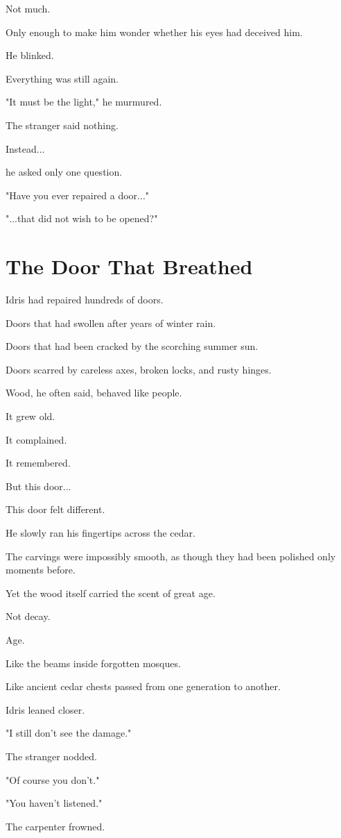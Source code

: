 \documentclass[12pt,openany]{book}
\begin{document}
Not much.

Only enough to make him wonder whether his eyes had deceived him.

He blinked.

Everything was still again.

"It must be the light," he murmured.

The stranger said nothing.

Instead...

he asked only one question.

"Have you ever repaired a door..."

"...that did not wish to be opened?"
\section*{The Door That Breathed}

Idris had repaired hundreds of doors.

Doors that had swollen after years of winter rain.

Doors that had been cracked by the scorching summer sun.

Doors scarred by careless axes, broken locks, and rusty hinges.

Wood, he often said, behaved like people.

It grew old.

It complained.

It remembered.

But this door...

This door felt different.

He slowly ran his fingertips across the cedar.

The carvings were impossibly smooth, as though they had been polished only moments before.

Yet the wood itself carried the scent of great age.

Not decay.

Age.

Like the beams inside forgotten mosques.

Like ancient cedar chests passed from one generation to another.

Idris leaned closer.

"I still don't see the damage."

The stranger nodded.

"Of course you don't."

"You haven't listened."

The carpenter frowned.
\end{document}
